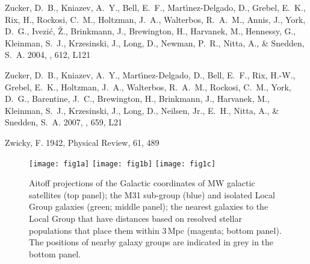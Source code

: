 \documentclass[manuscript]{aastex}
\begin{document}
\begin{thebibliography}{381}
{Zucker}, D.~B., {Kniazev}, A.~Y., {Bell}, E.~F., {Mart{\'{\i}}nez-Delgado},
  D., {Grebel}, E.~K., {Rix}, H., {Rockosi}, C.~M., {Holtzman}, J.~A.,
  {Walterbos}, R.~A.~M., {Annis}, J., {York}, D.~G., {Ivezi{\' c}}, {\v Z}.,
  {Brinkmann}, J., {Brewington}, H., {Harvanek}, M., {Hennessy}, G.,
  {Kleinman}, S.~J., {Krzesinski}, J., {Long}, D., {Newman}, P.~R., {Nitta},
  A., \& {Snedden}, S.~A. 2004, \apjl, 612, L121

{Zucker}, D.~B., {Kniazev}, A.~Y., {Mart{\'{\i}}nez-Delgado}, D., {Bell},
  E.~F., {Rix}, H.-W., {Grebel}, E.~K., {Holtzman}, J.~A., {Walterbos},
  R.~A.~M., {Rockosi}, C.~M., {York}, D.~G., {Barentine}, J.~C., {Brewington},
  H., {Brinkmann}, J., {Harvanek}, M., {Kleinman}, S.~J., {Krzesinski}, J.,
  {Long}, D., {Neilsen}, Jr., E.~H., {Nitta}, A., \& {Snedden}, S.~A. 2007,
  \apjl, 659, L21

{Zwicky}, F. 1942, Physical Review, 61, 489

\end{thebibliography}



\clearpage

\begin{figure*}
  \begin{center}
    \texttt{[image: fig1a]}
    \texttt{[image: fig1b]}
    \texttt{[image: fig1c]}
   \caption{{\footnotesize Aitoff projections of the Galactic coordinates of MW
     galactic satellites (top panel); the M31 sub-group (blue) and
     isolated Local Group galaxies (green; middle panel);
     the nearest galaxies to the Local Group that have distances based
     on resolved stellar populations that place them within 3\,Mpc
     (magenta; bottom panel). The positions of nearby
     galaxy groups are indicated in grey in the bottom panel.}}
  \end{center}
\end{figure*}
\end{document}
